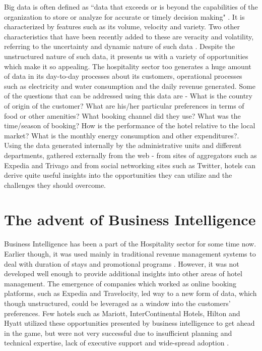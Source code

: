 \documentclass[sigconf]{acmart}
\begin{document}
Big data is often defined as ``data that exceeds or is beyond the capabilities of the organization to store or analyze for accurate or timely decision making" \cite {phillipswrenhoskisson01}. It is characterized by features such as its volume, velocity and variety. Two other characteristics that have been recently added to these are veracity and volatility, referring to the uncertainty and dynamic nature of such data \cite {phillipswrenhoskisson01}. Despite the unstructured nature of such data, it presents us with a variety of opportunities which make it so appealing.
\newline The hospitality sector too generates a huge amount of data in its day-to-day processes about its customers, operational processes such as electricity and water consumption and the daily revenue generated. Some of the questions that can be addressed using this data are - What is the country of origin of the customer? What are his/her particular preferences in terms of food or other amenities? What booking channel did they use? What was the time/season of booking? How is the performance of the hotel relative to the local market? What is the monthly energy consumption and other expenditures?\cite {bigdatapredictive02}.
\newline Using the data generated internally by the administrative units and different departments, gathered externally from the web - from sites of aggregators such as Expedia and Trivago and from social networking sites such as Twitter, hotels can derive quite useful insights into the opportunities they can utilize and the challenges they should overcome. 

\section{The advent of Business Intelligence}

Business Intelligence has been a part of the Hospitality sector for some time now. Earlier though, it was used mainly in traditional revenue management systems to deal with duration of stays and promotional programs \cite {kortefrolick03}. However, it was not developed well enough to provide additional insights into other areas of hotel management. The emergence of companies which worked as online booking platforms, such as Expedia and Travelocity, led way to a new form of data, which though unstructured, could be leveraged as a window into the customers' preferences. Few hotels such as Mariott, InterContinental Hotels, Hilton and Hyatt utilized these opportunities presented by business intelligence to get ahead in the game, but were not very successful due to insufficient planning and technical expertise, lack of executive support and wide-spread adoption \cite {kortefrolick03}.
\end{document}

